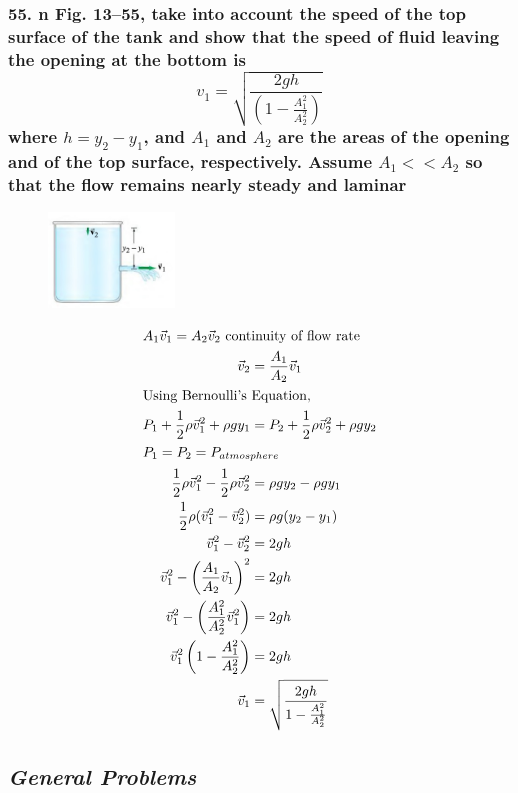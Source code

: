 \documentclass{article}
\begin{document}
\subsubsection*{
    55. n Fig. 13–55, take into account the speed of the top surface of the
    tank and show that the speed of fluid leaving the opening at the bottom is 
    \[
        v_1 = \sqrt{\displaystyle\frac{2gh}{(1-\frac{A^2_1}{A^2_2})}}
    \]
    where $h = y_2 - y_1$, and $A_1$ and $A_2$ are the areas of the opening and
    of the top surface, respectively. Assume $A_1 << A_2$ so that the flow
    remains nearly steady and laminar 
}
\begin{figure}[h]
    \begin{center}
        \includegraphics[width=0.3\textwidth]{figures/p55.jpg}
    \end{center}
\end{figure}
\begin{align*}
    \intertext{$A_1\vec v_1 = A_2\vec v_2$ continuity of flow rate}
    \vec v_2 &= \displaystyle\frac{A_1}{A_2}\vec v_1 \\
    \intertext{Using Bernoulli's Equation,}
    P_{1} + \frac 1 2 \rho\vec v_{1}^2 + \rho gy_{1} &= P_{2} + \frac 1 2 \rho\vec v_{2}^2 + \rho gy_{2} \\
    \intertext{$P_1 = P_2 = P_{atmosphere}$}
    \frac 1 2 \rho\vec v_1^2 - \frac 1 2 \rho\vec v_2^2 &= \rho gy_2 - \rho gy_1 \\
    \frac 1 2 \rho(\vec v_1^2 - \vec v_2^2) &= \rho g(y_2 - y_1) \\
    \vec v_1^2 - \vec v_2^2 &= 2gh \\
    \vec v_1^2 - \left(\frac{A_1}{A_2}\vec v_1\right)^2 &= 2gh \\
    \vec v_1^2 - \left(\frac{A_1^2}{A_2^2}\vec v_1^2\right) &= 2gh \\
    \vec v_1^2 \left(1 - \frac{A_1^2}{A_2^2}\right) &= 2gh \\
    \vec v_1 &= \sqrt{\displaystyle\frac{2gh}{1 - \frac{A_1^2}{A_2^2}}}
\end{align*}
\newpage
\begin{center}
    \subsection*{\textbf{\textit{General Problems}}}
\end{center}
\end{document}
